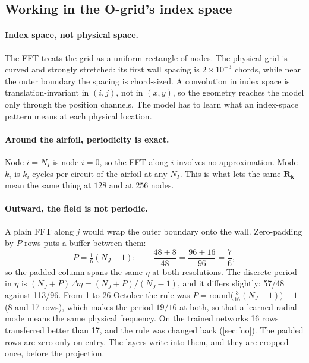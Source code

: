 \subsection{Working in the O-grid's index space}

\paragraph{Index space, not physical space.}
The FFT treats the grid as a uniform rectangle of nodes. The physical grid is curved and strongly
stretched: its first wall spacing is $2\times10^{-3}$ chords, while near the outer boundary the
spacing is chord-sized. A convolution in index space is translation-invariant in $(i,j)$, not in
$(x,y)$, so the geometry reaches the model only through the position channels. The model has to
learn what an index-space pattern means at each physical location.

\paragraph{Around the airfoil, periodicity is exact.}
Node $i = N_I$ is node $i = 0$, so the FFT along $i$ involves no approximation. Mode $k_i$ is
$k_i$ cycles per circuit of the airfoil at any $N_I$. This is what lets the same $\bm R_{\bm k}$
mean the same thing at $128$ and at $256$ nodes.

\paragraph{Outward, the field is not periodic.}
A plain FFT along $j$ would wrap the outer boundary onto the wall. Zero-padding by $P$ rows puts a
buffer between them:
\begin{equation}
  P = \tfrac{1}{6}(N_J - 1):\qquad
  \frac{48 + 8}{48} = \frac{96 + 16}{96} = \frac{7}{6},
\end{equation}
so the padded column spans the same $\eta$ at both resolutions. The discrete period in $\eta$ is
$(N_J + P)\,\Delta\eta = (N_J + P)/(N_J - 1)$, and it differs slightly: 57/48 against 113/96.
From 1 to 26 October the rule was $P = \mathrm{round}\bigl(\tfrac{3}{16}(N_J - 1)\bigr) - 1$ (8 and
17 rows), which makes the period $19/16$ at both, so that a learned radial mode means the same
physical frequency. On the trained networks 16 rows transferred better than 17, and the rule was
changed back (\cref{sec:fno}). The padded rows are zero only on entry. The layers write into them,
and they are cropped once, before the projection.

